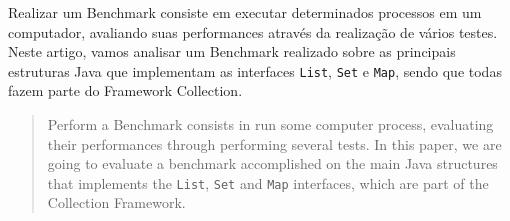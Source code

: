 \begin{resumo} 
	Realizar um Benchmark consiste em executar determinados processos em um computador, avaliando suas performances através da realização de vários testes. Neste artigo, vamos analisar um Benchmark realizado sobre as principais estruturas Java que implementam as interfaces \texttt{List}, \texttt{Set} e \texttt{Map}, sendo que todas fazem parte do Framework Collection.
\end{resumo}

\begin{abstract}
  Perform a Benchmark consists in run some computer process, evaluating their performances through performing several tests. In this paper, we are going to evaluate a benchmark accomplished on the main Java structures that implements the \texttt{List}, \texttt{Set} and \texttt{Map} interfaces, which are part of the Collection Framework.
\end{abstract}


